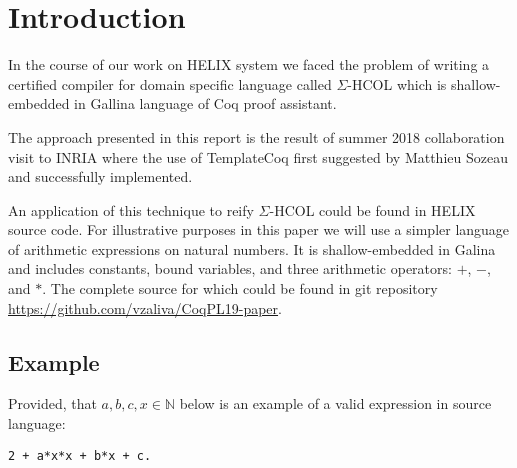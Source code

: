 \documentclass[sigplan]{acmart}\settopmatter{printfolios=true,printccs=false,printacmref=false}
\newcommand{\N}{\mathbb{N}}
\begin{document}


\maketitle

\section{Introduction}

In the course of our work on HELIX system\cite{helixFHPC18} we faced
the problem of writing a certified compiler for domain specific
language called $\Sigma$-HCOL which is shallow-embedded in Gallina
language of Coq\cite{Coq} proof assistant.

The approach presented in this report is the result of summer 2018
collaboration visit to INRIA where the use of
TemplateCoq\cite{anand2018towards} first suggested by Matthieu Sozeau
and successfully implemented.

An application of this technique to reify $\Sigma$-HCOL could be found
in HELIX source code. For illustrative purposes in this paper we will
use a simpler language of arithmetic expressions on natural
numbers. It is shallow-embedded in Galina and includes constants,
bound variables, and three arithmetic operators: $+$, $-$, and
$*$. The complete source for which could be found in git repository
\url{https://github.com/vzaliva/CoqPL19-paper}.

\subsection{Example}

Provided, that $a, b, c, x \in \N$ below is an example of a valid
expression in source language:

\begin{lstlisting}[language=Coq, mathescape=true,
  frame=single, basicstyle=\footnotesize,
  caption=Expression in source language,
  label=lst:sexp]
2 + a*x*x + b*x + c.
\end{lstlisting}
\end{document}

